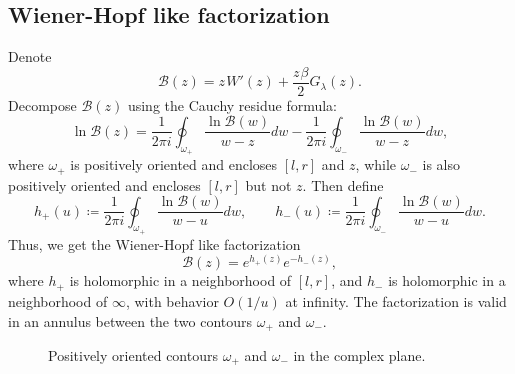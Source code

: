 \documentclass[letterpaper,11pt,oneside,reqno]{book}
\numberwithin{equation}{chapter}  %
\newcommand{\ssp}{\hspace{1pt}}
\theoremstyle{definition}
\begin{document}
\subsection{Wiener-Hopf like factorization}

Denote
\begin{equation*}
	\mathcal{B}(z)=z\ssp W'(z)+\frac{z\ssp\beta}{2}G_\lambda(z).
\end{equation*}
Decompose $\mathcal{B}(z)$ using the Cauchy residue formula:
\begin{equation*}
	\ln \mathcal{B}(z)=\frac{1}{2\pi i}\oint_{\omega_+}
	\frac{\ln \mathcal{B}(w)}{w-z}dw-
	\frac{1}{2\pi i}\oint_{\omega_-}
	\frac{\ln \mathcal{B}(w)}{w-z}dw,
\end{equation*}
where $\omega_+$ is positively oriented and encloses $[l,r]$ and $z$,
while $\omega_-$ is also positively oriented and encloses $[l,r]$ but not $z$.
Then define
\begin{equation*}
	h_+(u)\coloneqq \frac{1}{2\pi i}\oint_{\omega_+}
	\frac{\ln \mathcal{B}(w)}{w-u}dw,\qquad
	h_-(u)\coloneqq \frac{1}{2\pi i}\oint_{\omega_-}
	\frac{\ln \mathcal{B}(w)}{w-u}dw.
\end{equation*}
Thus, we get the Wiener-Hopf like factorization
\begin{equation*}
	\mathcal{B}(z)=e^{h_+(z)}e^{-h_-(z)},
\end{equation*}
where $h_+$ is holomorphic in a neighborhood of $[l,r]$, and
$h_-$ is holomorphic in a neighborhood of $\infty$, with behavior $O(1/u)$ at infinity.
The factorization is valid in an annulus between the two contours $\omega_+$ and $\omega_-$.

\begin{figure}[htpb]
	\centering
	\caption{Positively oriented contours $\omega_+$ and $\omega_-$ in the complex plane.}
	\label{lecture9:fig:contours}
\end{figure}
\end{document}
